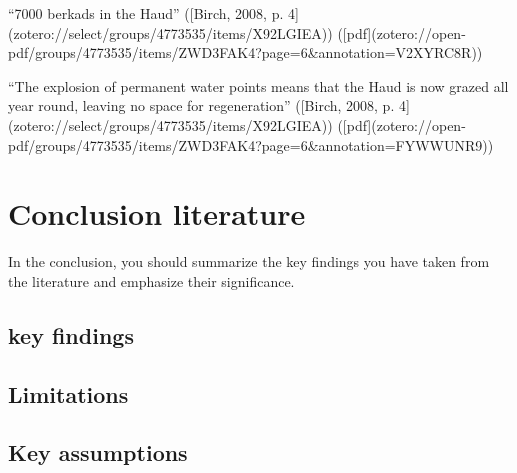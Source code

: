 {{“7000 berkads in the Haud” ([Birch, 2008, p. 4](zotero://select/groups/4773535/items/X92LGIEA)) ([pdf](zotero://open-pdf/groups/4773535/items/ZWD3FAK4?page=6&annotation=V2XYRC8R))

“The explosion of permanent water points means that the Haud is now grazed all year round, leaving no space for regeneration” ([Birch, 2008, p. 4](zotero://select/groups/4773535/items/X92LGIEA)) ([pdf](zotero://open-pdf/groups/4773535/items/ZWD3FAK4?page=6&annotation=FYWWUNR9))





\section{Conclusion literature}
In the conclusion, you should summarize the key findings you have taken from the literature and emphasize their significance.

\subsection{key findings}


\subsection{Limitations}



\subsection{Key assumptions}





}}
